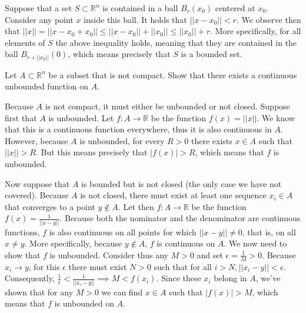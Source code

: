 \begin{solution}

    Suppose that a set $S \subset \mathbb{R}^n$ is contained in a ball $B_r(x_0)$ centered at $x_0$. Consider any point $x$ inside this ball. It holds that $\lvert \vert x - x_0 \rvert \rvert < r$. We observe then that $\lvert \lvert x \rvert \rvert = \lvert \lvert x - x_0 + x_0 \rvert \rvert \leq \lvert \lvert x - x_0 \rvert \rvert + \lvert \lvert x_0 \rvert \rvert \leq \lvert \lvert x_0 \rvert \rvert + r$. More specifically, for all elements of $S$ the above inequality holds, meaning that they are contained in the ball $B_{r + \lvert \lvert x_0 \rvert \rvert}(0)$, which means precisely that $S$ is a bounded set.
\end{solution}

\begin{exercise}{2}
    Let $A \subset \mathbb{R}^n$ be a subset that is not compact. Show that there exists a continuous unbounded function on $A$.
\end{exercise}

\begin{solution}

    Because $A$ is not compact, it must either be unbounded or not closed. Suppose first that $A$ is unbounded. Let $f: A \rightarrow \mathbb{R}$ be the function $f(x) = \lvert \lvert x \rvert \rvert$. We know that this is a continuous function everywhere, thus it is also continuous in $A$. However, because $A$ is unbounded, for every $R > 0$ there exists $x \in A$ such that $\lvert \lvert x \rvert \rvert > R$. But this means precisely that $\lvert f(x) \rvert > R$, which means that $f$ is unbounded.

    Now suppose that $A$ is bounded but is not closed (the only case we have not covered). Because $A$ is not closed, there must exist at least one sequence $x_i \in A$ that converges to a point $y \notin A$. Let then $f: A \rightarrow \mathbb{R}$ be the function $f(x) = \frac{1}{\lvert \lvert x - y \rvert \rvert}$. Because both the nominator and the denominator are continuous functions, $f$ is also continuous on all points for which $\lvert \lvert x - y \rvert \rvert \neq 0$, that is, on all $x \neq y$. More specifically, because $y \notin A$, $f$ is continuous on $A$. We now need to show that $f$ is unbounded. Consider thus any $M > 0$ and set $\epsilon = \frac{1}{M} > 0$. Because $x_i \rightarrow y$, for this $\epsilon$ there must exist $N > 0$ such that for all $i > N, \lvert \lvert x_i - y \rvert \rvert < \epsilon$. Consequently, $\frac{1}{\epsilon} < \frac{1}{\lvert \lvert x_i - y \rvert \rvert} \implies M < f(x_i)$. Since these $x_i$ belong in $A$, we've shown that for any $M > 0$ we can find $x \in A$ such that $\lvert f(x) \rvert > M$, which means that $f$ is unbounded on $A$.
\end{solution}

